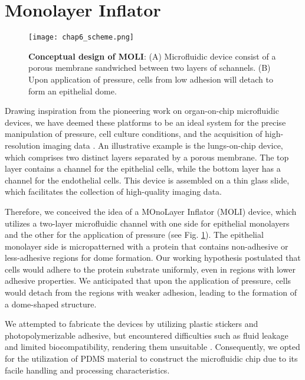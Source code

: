 \hypertarget{monolayer-inflator}{%
\section{Monolayer Inflator}\label{monolayer-inflator}}

\begin{figure}[b!]
	\centering
	\texttt{[image: chap6\_scheme.png]}
	\caption{\textbf{Conceptual design of MOLI}: (A) Microfluidic device consist of a porous membrane sandwiched between two layers of schannels. (B) Upon application of pressure, cells from low adhesion will detach to form an epithelial dome. 
	}\label{fig_6_1}
\end{figure}

Drawing inspiration from the pioneering work on organ-on-chip microfluidic devices, we have deemed these platforms to be an ideal system for the precise manipulation of pressure, cell culture conditions, and the acquisition of high-resolution imaging data \cite{huh2010, nelson2017}. An illustrative example is the lungs-on-chip device, which comprises two distinct layers separated by a porous membrane. The top layer contains a channel for the epithelial cells, while the bottom layer has a channel for the endothelial cells. This device is assembled on a thin glass slide, which facilitates the collection of high-quality imaging data. 

Therefore, we conceived the idea of a MOnoLayer Inflator (MOLI) device, which utilizes a two-layer microfluidic channel with one side for epithelial monolayers and the other for the application of pressure (see Fig. \ref{fig_6_1}). The epithelial monolayer side is micropatterned with a protein that contains non-adhesive or less-adhesive regions for dome formation. Our working hypothesis postulated that cells would adhere to the protein substrate uniformly, even in regions with lower adhesive properties. We anticipated that upon the application of pressure, cells would detach from the regions with weaker adhesion, leading to the formation of a dome-shaped structure.

We attempted to fabricate the devices by utilizing plastic stickers and photopolymerizable adhesive, but encountered difficulties such as fluid leakage and limited biocompatibility, rendering them unsuitable \cite{sollier2011, bartolo2008}. Consequently, we opted for the utilization of PDMS material to construct the microfluidic chip due to its facile handling and processing characteristics.


